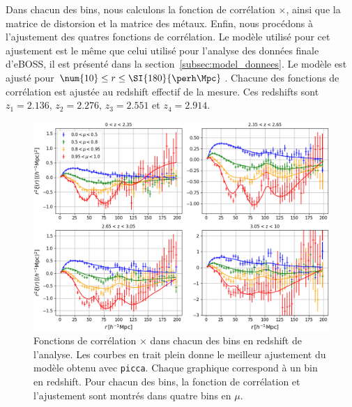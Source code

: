 Dans chacun des bins, nous calculons la fonction de corrélation \lya{}$\times$\lya{}, ainsi que la matrice de distorsion et la matrice des métaux.
Enfin, nous procédons à l'ajustement des quatres fonctions de corrélation. Le modèle utilisé pour cet ajustement est le même que celui utilisé pour l'analyse des données finale d'eBOSS, il est présenté dans la section~\ref{subsec:model_donnees}.
Le modèle est ajusté pour $\num{10} \leq r \leq \SI{180}{\perh\Mpc}$.
Chacune des fonctions de corrélation est ajustée au redshift effectif de la mesure. Ces redshifts sont $z_1 = \num{2.136}$, $z_2 = \num{2.276}$, $z_3 = \num{2.551}$ et $z_4 = \num{2.914}$.

\begin{figure}
  \centering
  \includegraphics[scale=0.4]{dr16_4bins}
  \caption{Fonctions de corrélation \lya{}$\times$\lya{} dans chacun des bins en redshift de l'analyse. Les courbes en trait plein donne le meilleur ajustement du modèle obtenu avec \texttt{picca}. Chaque graphique correspond à un bin en redshift. Pour chacun des bins, la fonction de corrélation et l'ajustement sont montrés dans quatre bins en $\mu$.}
  \label{fig:dr16_4bins}
\end{figure}

